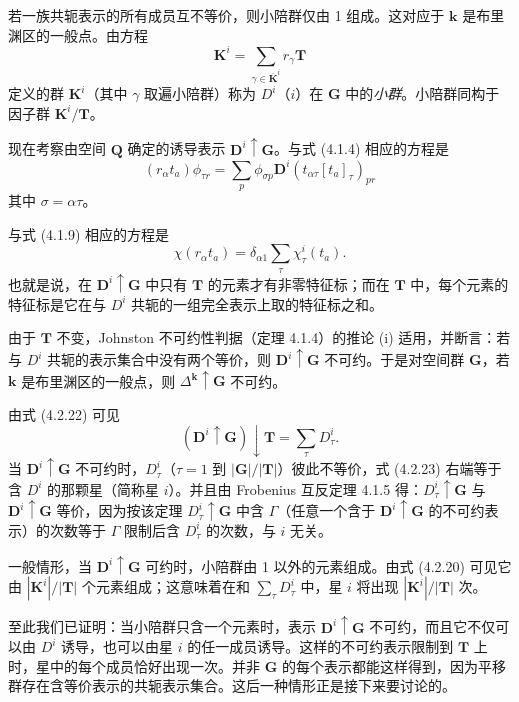若一族共轭表示的所有成员互不等价，则小陪群仅由 1 组成。这对应于 $\mathbf{k}$ 是布里渊区的一般点。由方程
\begin{equation*}
\mathbf{K}^{i} = \sum_{\gamma \in \overline{\mathbf{K}}^{i}}r_{\gamma}\mathbf{T}
\tag{4.2.20}
\end{equation*}
定义的群 $\mathbf{K}^{i}$（其中 $\gamma$ 取遍小陪群）称为 $D^{i}$（$i$）在 $\mathbf{G}$ 中的\textit{小群}。小陪群同构于因子群 $\mathbf{K}^{i}/\mathbf{T}$。

现在考察由空间 $\mathbf{Q}$ 确定的诱导表示 $\mathbf{D}^{i} \uparrow \mathbf{G}$。与式 (4.1.4) 相应的方程是
\begin{equation*}
(r_{\alpha}t_{a})\phi_{\tau r} = \sum_{p}\phi_{\sigma p}\mathbf{D}^{i}(t_{\alpha\tau}[t_{a}]_{\tau})_{pr}
\tag{4.2.21}
\end{equation*}
其中 $\sigma = \alpha\tau$。

与式 (4.1.9) 相应的方程是
\begin{equation*}
\chi(r_{\alpha}t_{a}) = \delta_{\alpha 1}\sum_{\tau}\chi^{i}_{\tau}(t_{a}).
\tag{4.2.22}
\end{equation*}
也就是说，在 $\mathbf{D}^{i} \uparrow \mathbf{G}$ 中只有 $\mathbf{T}$ 的元素才有非零特征标；而在 $\mathbf{T}$ 中，每个元素的特征标是它在与 $D^{i}$ 共轭的一组完全表示上取的特征标之和。

由于 $\mathbf{T}$ 不变，Johnston 不可约性判据（定理 4.1.4）的推论 (i) 适用，并断言：若与 $D^{i}$ 共轭的表示集合中没有两个等价，则 $\mathbf{D}^{i} \uparrow \mathbf{G}$ 不可约。于是对空间群 $\mathbf{G}$，若 $\mathbf{k}$ 是布里渊区的一般点，则 $\Delta^{\mathbf{k}} \uparrow \mathbf{G}$ 不可约。

由式 (4.2.22) 可见
\begin{equation*}
(\mathbf{D}^{i} \uparrow \mathbf{G}) \downarrow \mathbf{T} = \sum_{\tau}D^{i}_{\tau}.
\tag{4.2.23}
\end{equation*}
当 $\mathbf{D}^{i} \uparrow \mathbf{G}$ 不可约时，$D^{i}_{\tau}$（$\tau = 1$ 到 $|\mathbf{G}|/|\mathbf{T}|$）彼此不等价，式 (4.2.23) 右端等于含 $D^{i}$ 的那颗星（简称星 $i$）。并且由 Frobenius 互反定理 4.1.5 得：$D^{i}_{\tau} \uparrow \mathbf{G}$ 与 $\mathbf{D}^{i} \uparrow \mathbf{G}$ 等价，因为按该定理 $D^{i}_{\tau} \uparrow \mathbf{G}$ 中含 $\Gamma$（任意一个含于 $\mathbf{D}^{i} \uparrow \mathbf{G}$ 的不可约表示）的次数等于 $\Gamma$ 限制后含 $D^{i}_{\tau}$ 的次数，与 $i$ 无关。

一般情形，当 $\mathbf{D}^{i} \uparrow \mathbf{G}$ 可约时，小陪群由 1 以外的元素组成。由式 (4.2.20) 可见它由 $|\mathbf{K}^{i}|/|\mathbf{T}|$ 个元素组成；这意味着在和 $\sum_{\tau}D^{i}_{\tau}$ 中，星 $i$ 将出现 $|\mathbf{K}^{i}|/|\mathbf{T}|$ 次。

至此我们已证明：当小陪群只含一个元素时，表示 $\mathbf{D}^{i} \uparrow \mathbf{G}$ 不可约，而且它不仅可以由 $D^{i}$ 诱导，也可以由星 $i$ 的任一成员诱导。这样的不可约表示限制到 $\mathbf{T}$ 上时，星中的每个成员恰好出现一次。并非 $\mathbf{G}$ 的每个表示都能这样得到，因为平移群存在含等价表示的共轭表示集合。这后一种情形正是接下来要讨论的。
